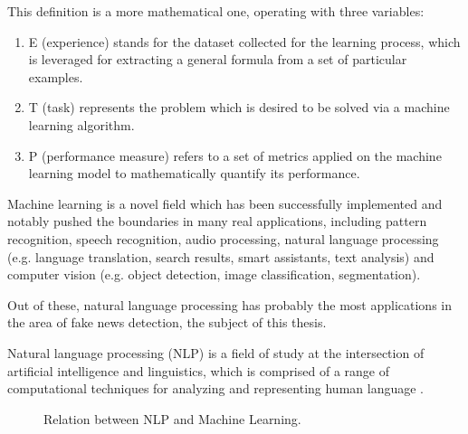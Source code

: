 This definition is a more mathematical one, operating with three variables:
\begin{enumerate}
  \item E (experience) stands for the dataset collected for the learning process, which is leveraged for extracting a general formula from a set of particular examples.
  \item T (task) represents the problem which is desired to be solved via a machine learning algorithm.
  \item P (performance measure) refers to a set of metrics applied on the machine learning model to mathematically quantify its performance.    
\end{enumerate}

Machine learning is a novel field which has been successfully implemented and notably pushed the boundaries in many real applications, including pattern recognition, speech recognition, audio processing, natural language processing (e.g. language translation, search results, smart assistants, text analysis) and computer vision (e.g. object detection, image classification, segmentation).

Out of these, natural language processing has probably the most applications in the area of fake news detection, the subject of this thesis.

\begin{definition}
  Natural language processing (NLP) is a field of study at the intersection of artificial intelligence and linguistics, which is comprised of a range of computational techniques for analyzing and representing human language \cite{a8}.
\end{definition}


\begin{figure}[h]
  \centering
  \caption{Relation between NLP and Machine Learning.}
\end{figure}

